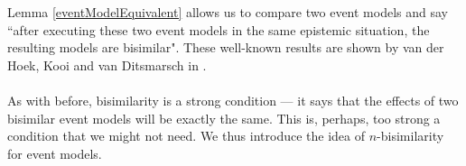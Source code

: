 Lemma \ref{eventModelEquivalent} allows us to compare two event models and say ``after executing
these two event models in the same epistemic situation, the resulting models are bisimilar".
These well-known results are shown by van der Hoek, Kooi and van Ditsmarsch in
\cite{hoek2008dynamic}.\\
\\
As with before, bisimilarity is a strong condition --- it says that the effects of two bisimilar
event models will be exactly the same.
This is, perhaps, too strong a condition that we might not need.
We thus introduce the idea of $n$-bisimilarity for event models.

%
